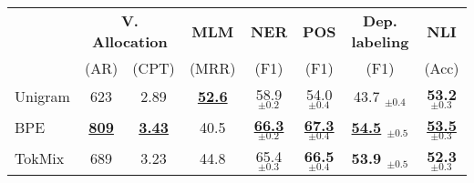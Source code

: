 \documentclass{standalone}
\begin{document}
\begin{tabular}{lccccccc}
    \toprule
    & \multicolumn{2}{c}{\bf{V. Allocation}}  &  \bf{MLM} &               \bf{NER} &               \bf{POS} &                \bf{Dep. labeling} &              \bf{NLI} \\
     & (AR) &   (CPT) &   (MRR) &               (F1) &               (F1) &                (F1) &              (Acc) \\
    \midrule
    Unigram   &       623 &  2.89 &  \bf{\underline{52.6}} &  58.9 $_{\pm0.2}$ &  54.0 $_{\pm0.4}$ &  43.7 $_{\pm0.4}$ &  \bf{53.2} $_{\pm0.3}$ \\
    BPE       &       \bf{\underline{809}} &  \bf{\underline{3.43}} &  40.5 &  \bf{\underline{66.3}} $_{\pm0.2}$ &  \bf{\underline{67.3}} $_{\pm0.4}$ &  \bf{\underline{54.5}} $_{\pm0.5}$ &  \bf{\underline{53.5}} $_{\pm0.3}$ \\
    TokMix    &       689 &  3.23 &  44.8 &  65.4 $_{\pm0.3}$ &  \bf{66.5} $_{\pm0.4}$ &  \bf{53.9} $_{\pm0.5}$ &  \bf{52.3} $_{\pm0.3}$ \\
    \bottomrule
\end{tabular}
\end{document}
